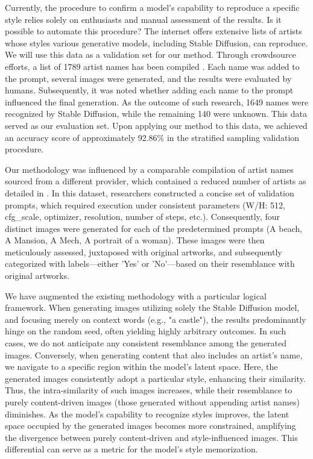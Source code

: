 \documentclass[12pt, letterpaper]{article}
\begin{document}
Currently, the procedure to confirm a model's capability to reproduce a specific style relies solely on enthusiasts and manual assessment of the results. Is it possible to automate this procedure? The internet offers extensive lists of artists whose styles various generative models, including Stable Diffusion, can reproduce. We will use this data as a validation set for our method. Through crowdsource efforts, a list of 1789 artist names has been compiled \cite{image-style-study-2023-part1}. Each name was added to the prompt, several images were generated, and the results were evaluated by humans. Subsequently, it was noted whether adding each name to the prompt influenced the final generation. As the outcome of such research, 1649 names were recognized by Stable Diffusion, while the remaining 140 were unknown. This data served as our evaluation set. Upon applying our method to this data, we achieved an accuracy score of approximately 92.86\% in the stratified sampling validation procedure.

Our methodology was influenced by a comparable compilation of artist names sourced from a different provider, which contained a reduced number of artists as detailed in \cite{artiststudy2022}. In this dataset, researchers constructed a concise set of validation prompts, which required execution under consistent parameters (W/H: 512, cfg\_scale, optimizer, resolution, number of steps, etc.). Consequently, four distinct images were generated for each of the predetermined prompts (A beach, A Mansion, A Mech, A portrait of a woman). These images were then meticulously assessed, juxtaposed with original artworks, and subsequently categorized with labels—either 'Yes' or 'No'—based on their resemblance with original artworks.

We have augmented the existing methodology with a particular logical framework. When generating images utilizing solely the Stable Diffusion model, and focusing merely on context words (e.g., "a castle"), the results predominantly hinge on the random seed, often yielding highly arbitrary outcomes. In such cases, we do not anticipate any consistent resemblance among the generated images. Conversely, when generating content that also includes an artist's name, we navigate to a specific region within the model's latent space. Here, the generated images consistently adopt a particular style, enhancing their similarity. Thus, the intra-similarity of such images increases, while their resemblance to purely content-driven images (those generated without appending artist names) diminishes. As the model's capability to recognize styles improves, the latent space occupied by the generated images becomes more constrained, amplifying the divergence between purely content-driven and style-influenced images. This differential can serve as a metric for the model's style memorization.
\end{document}
